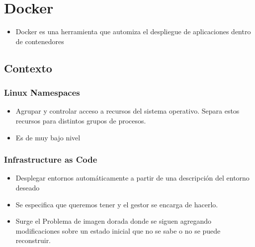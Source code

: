 \section{Docker}
\begin{itemize}
\item Docker es una herramienta que automiza el despliegue de aplicaciones dentro de contenedores
\end{itemize}


\subsection*{Contexto}
\subsubsection*{Linux Namespaces}
\begin{itemize}
\item Agrupar y controlar acceso a recursos del sistema operativo. Separa estos recursos para distintos grupos de procesos.
\item Es de muy bajo nivel
\end{itemize}


\subsubsection*{Infrastructure as Code}
\begin{itemize}
\item Desplegar entornos automáticamente a partir de una descripción del entorno deseado
\item Se especifica que queremos tener y el gestor se encarga de hacerlo.
\item Surge el Problema de imagen dorada donde se siguen agregando modificaciones sobre un estado inicial que no se sabe o no se puede reconstruir.
\end{itemize}



